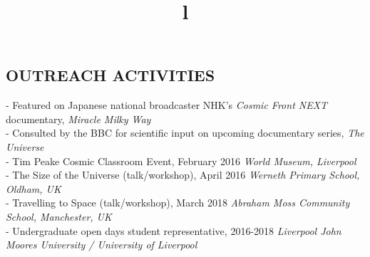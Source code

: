 \documentclass[margin]{res}
\begin{document}
\begin{resume}
\section{OUTREACH ACTIVITIES}
\par
- Featured on Japanese national broadcaster NHK's \emph{Cosmic Front NEXT} documentary, \emph{Miracle Milky Way}\\
- Consulted by the BBC for scientific input on upcoming documentary series, \emph{The Universe}\\
- Tim Peake Cosmic Classroom Event, February 2016 \emph{World Museum, Liverpool}\\
- The Size of the Universe (talk/workshop), April 2016 \emph{Werneth Primary School, Oldham, UK}\\
- Travelling to Space (talk/workshop), March 2018 \emph{Abraham Moss Community School, Manchester, UK}\\
- Undergraduate open days student representative, 2016-2018 \emph{Liverpool John Moores University / University of Liverpool}


\begin{format}
\title{l}\\
\\
\body\\
\end{format}

\end{resume}
\end{document}
